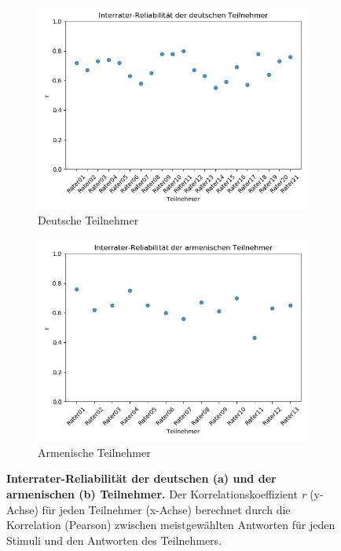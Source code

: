 \documentclass[11pt,a4paper,headsepline,twoside,toc=bibliography]{scrreprt}
\begin{document}
\begin{figure}
	\centering
	\begin{subfigure}{1\textwidth}
		\centering
		\includegraphics[width=0.9\linewidth]{plots/ewe_de.png}
		\caption{Deutsche Teilnehmer}
		\label{fig:ewe_de}
	\end{subfigure}
	\par\bigskip
	\begin{subfigure}{1\textwidth}
		\centering
		\includegraphics[width=0.9\linewidth]{plots/ewe_am.png}
		\caption{Armenische Teilnehmer}
		\label{fig:ewe_am}
	\end{subfigure}
	\caption{\textbf{Interrater-Reliabilität der deutschen (a) und der armenischen (b) Teilnehmer.} Der Korrelationskoeffizient \emph{r} (y-Achse) für jeden Teilnehmer (x-Achse) berechnet durch die Korrelation (Pearson) zwischen meistgewählten Antworten für jeden Stimuli  und den Antworten des Teilnehmers.}
	\label{fig:ewe}
	
	
\end{figure}
\end{document}
